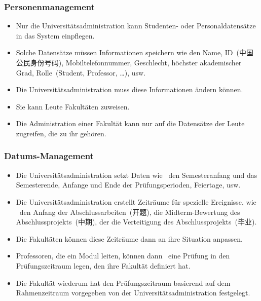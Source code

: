 \documentclass[aspectratio=169,mathserif,notheorems]{beamer}%
\begin{document}
\begin{frame}%
\frametitle{Personenmanagement}%
\begin{itemize}%
\item Nur die Universitätsadministration kann Studenten- oder Personaldatensätze in das System einpflegen.%
%
\item<2-> Solche Datensätze müssen Informationen speichern wie den Name, ID~(中国公民身份号码\cite{GB116431999CIN}), Mobiltelefonnummer, Geschlecht, höchster akademischer Grad, Rolle~(Student, Professor, \dots), usw.%
%
\item<3-> Die Universitätsadministration muss diese Informationen ändern können.%
%
\item<4-> Sie kann Leute Fakultäten zuweisen.%
%
\item<5-> Die Administration einer Fakultät kann nur auf die Datensätze der Leute zugreifen, die zu ihr gehören.%
%
\end{itemize}%
\end{frame}%
%
\begin{frame}%
\frametitle{Datums-Management}%
\begin{itemize}%
\item Die Universitätsadministration setzt Daten wie \DEzB\ den Semesteranfang und das Semesterende, Anfange und Ende der Prüfungsperioden, Feiertage, usw.%
%
\item<2-> Die Universitätsadministration erstellt Zeiträume für spezielle Ereignisse, wie \DEzB\ den Anfang der Abschlussarbeiten~(开题), die Midterm-Bewertung des Abschlussprojekts~(中期), der die Verteitigung des Abschlussprojekts~(毕业).%
%
\item<3-> Die Fakultäten können diese Zeiträume dann an ihre Situation anpassen.%
%
\item<4-> Professoren, die ein Modul leiten, können dann \DEzB\ eine Prüfung in den Prüfungszeitraum legen, den ihre Fakultät definiert hat.%
%
\item<5-> Die Fakultät wiederum hat den Prüfungszeitraum basierend auf dem Rahmenzeitraum vorgegeben von der Universitätsadministration festgelegt.%
\end{itemize}%
\end{frame}%
%
\end{document}
